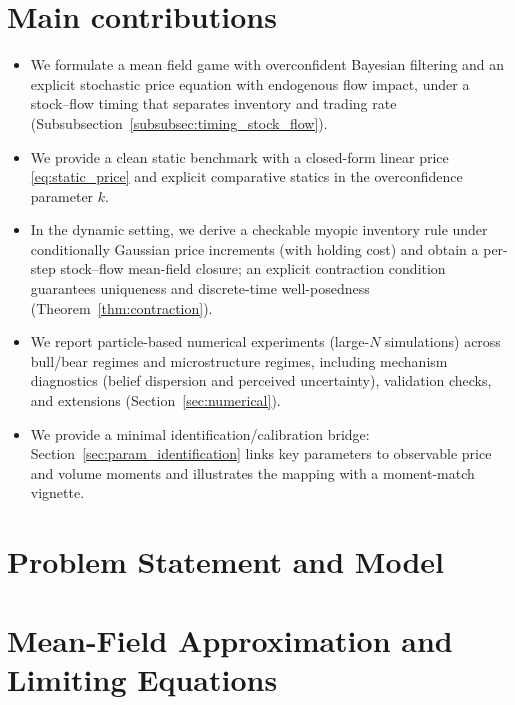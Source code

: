 \documentclass[11pt,a4paper]{article}
\theoremstyle{plain}
\theoremstyle{definition}
\theoremstyle{remark}
\newcommand{\CARA}{\text{CARA}}
\begin{document}
\section*{Main contributions}
\begin{itemize}
    \item We formulate a mean field game with overconfident Bayesian filtering and an explicit stochastic price equation with endogenous flow impact, under a stock--flow timing that separates inventory and trading rate (Subsubsection~\ref{subsubsec:timing_stock_flow}).
    \item We provide a clean static benchmark with a closed-form linear price \eqref{eq:static_price} and explicit comparative statics in the overconfidence parameter $k$.
    \item In the dynamic setting, we derive a checkable myopic \CARA inventory rule under conditionally Gaussian price increments (with holding cost) and obtain a per-step stock--flow mean-field closure; an explicit contraction condition guarantees uniqueness and discrete-time well-posedness (Theorem~\ref{thm:contraction}).
    \item We report particle-based numerical experiments (large-$N$ simulations) across bull/bear regimes and microstructure regimes, including mechanism diagnostics (belief dispersion and perceived uncertainty), validation checks, and extensions (Section~\ref{sec:numerical}).
    \item We provide a minimal identification/calibration bridge: Section~\ref{sec:param_identification} links key parameters to observable price and volume moments and illustrates the mapping with a moment-match vignette.
\end{itemize}


\section{Problem Statement and Model}
\label{sec:model}


\section{Mean-Field Approximation and Limiting Equations}
\label{sec:meanfield}



\end{document}
